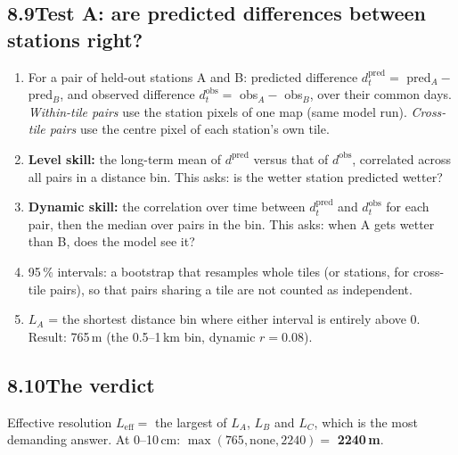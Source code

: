 \documentclass[11pt,a4paper]{article}
\begin{document}
\subsection*{8.9\quad Test A: are predicted differences between stations right?}
\begin{enumerate}
\item For a pair of held-out stations A and B: predicted difference $d^{\mathrm{pred}}_t = $ pred$_A - $ pred$_B$, and
      observed difference $d^{\mathrm{obs}}_t = $ obs$_A - $ obs$_B$, over their common days.
      \emph{Within-tile pairs} use the station pixels of one map (same model run).
      \emph{Cross-tile pairs} use the centre pixel of each station's own tile.
\item \textbf{Level skill:} the long-term mean of $d^{\mathrm{pred}}$ versus that of $d^{\mathrm{obs}}$, correlated across all pairs in a distance bin.
      This asks: is the wetter station predicted wetter?
\item \textbf{Dynamic skill:} the correlation over time between $d^{\mathrm{pred}}_t$ and $d^{\mathrm{obs}}_t$ for each pair, then the median over pairs in the bin.
      This asks: when A gets wetter than B, does the model see it?
\item 95\,\% intervals: a bootstrap that resamples whole tiles (or stations, for cross-tile pairs), so that pairs sharing a tile are not counted as independent.
\item $L_A$ = the shortest distance bin where either interval is entirely above 0. Result: 765\,m (the 0.5--1\,km bin, dynamic $r = 0.08$).
\end{enumerate}

\subsection*{8.10\quad The verdict}
Effective resolution $L_{\mathrm{eff}} = $ the largest of $L_A$, $L_B$ and $L_C$, which is the most demanding answer. At 0--10\,cm: $\max(765, \text{none}, 2240) = $ \textbf{2240\,m}.
\end{document}
